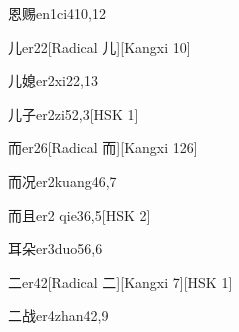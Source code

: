 \begin{entry}{恩赐}{en1ci4}{10,12}
\end{entry}

\begin{entry}{儿}{er2}{2}[Radical ⼉][Kangxi 10]
\end{entry}

\begin{entry}{儿媳}{er2xi2}{2,13}
\end{entry}

\begin{entry}{儿子}{er2zi5}{2,3}[HSK 1]
\end{entry}

\begin{entry}{而}{er2}{6}[Radical ⽽][Kangxi 126]
\end{entry}

\begin{entry}{而况}{er2kuang4}{6,7}
\end{entry}

\begin{entry}{而且}{er2 qie3}{6,5}[HSK 2]
\end{entry}

\begin{entry}{耳朵}{er3duo5}{6,6}
\end{entry}

\begin{entry}{二}{er4}{2}[Radical ⼆][Kangxi 7][HSK 1]
\end{entry}

\begin{entry}{二战}{er4zhan4}{2,9}
\end{entry}


